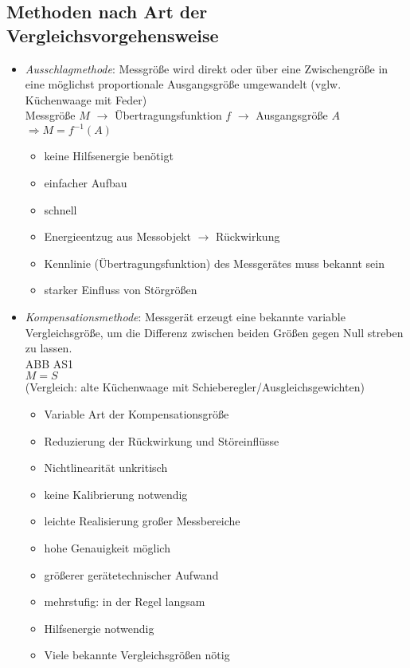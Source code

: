 \subsection{Methoden nach Art der Vergleichsvorgehensweise}
\begin{itemize}
\item \emph{Ausschlagmethode}: Messgröße wird direkt oder über eine Zwischengröße in eine möglichst proportionale Ausgangsgröße umgewandelt (vglw. Küchenwaage mit Feder)\\
Messgröße $M$ $\to$ Übertragungsfunktion $f$ $\to$ Ausgangsgröße $A$\\
$\Rightarrow \boxed{M = f^{-1}(A)}$
\begin{itemize}[label=$+$]
\item keine Hilfsenergie benötigt
\item einfacher Aufbau
\item schnell
\end{itemize}
\begin{itemize}[label=-]
\item Energieentzug aus Messobjekt $\to$ Rückwirkung
\item Kennlinie (Übertragungsfunktion) des Messgerätes muss bekannt sein
\item starker Einfluss von Störgrößen
\end{itemize}
\item \emph{Kompensationsmethode}: Messgerät erzeugt eine bekannte variable Vergleichsgröße, um die Differenz zwischen beiden Größen gegen Null streben zu lassen.\\
ABB AS1\\
$M=S$\\
(Vergleich: alte Küchenwaage mit Schieberegler/Ausgleichsgewichten)
\begin{itemize}[label=$+$]
\item Variable Art der Kompensationsgröße
\item Reduzierung der Rückwirkung und Störeinflüsse
\item Nichtlinearität unkritisch
\item keine Kalibrierung notwendig
\item leichte Realisierung großer Messbereiche
\item hohe Genauigkeit möglich
\end{itemize}
\begin{itemize}[label=$-$]
\item größerer gerätetechnischer Aufwand
\item mehrstufig: in der Regel langsam
\item Hilfsenergie notwendig
\item Viele bekannte Vergleichsgrößen nötig
\end{itemize}
\end{itemize}
